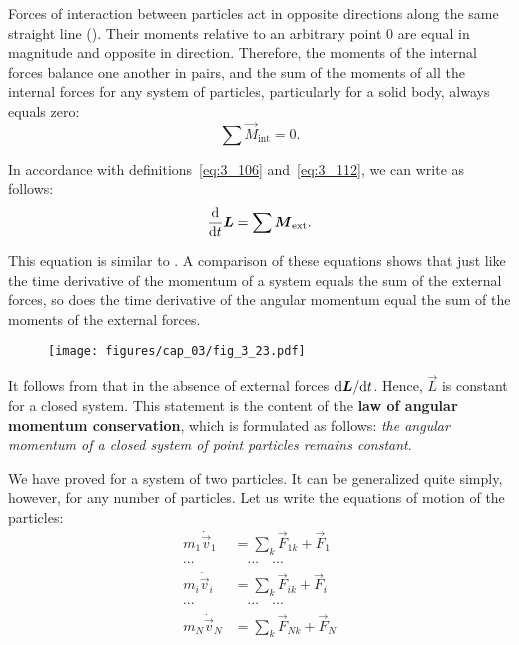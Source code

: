 Forces of interaction between particles act in opposite directions along the same straight line (). Their moments relative to an arbitrary point $0$ are equal in magnitude and opposite in direction. Therefore, the moments of the internal forces balance one another in pairs, and the sum of the moments of all the internal forces for any system of particles, particularly for a solid body, always equals zero:
\begin{equation}\label{eq:3_117}
\sum\vec{M}_{\text{int}} = 0.
\end{equation}

In accordance with definitions~\eqref{eq:3_106} and~\eqref{eq:3_112}, we can write  as follows:
\begin{equation}\label{eq:3_118}
\frac{\mathrm{d}}{\mathrm{d} t}\boldsymbol{L} = \sum\boldsymbol{M}_{\text{ext}}.
\end{equation}

\noindent
This equation is similar to . A comparison of these equations shows that just like the time derivative of the momentum of a system equals the sum of the external forces, so does the time derivative of the angular momentum equal the sum of the moments of the external forces.

\begin{figure}[t]
	\begin{center}
		\texttt{[image: figures/cap\_03/fig\_3\_23.pdf]}
		\caption[]{}
		\label{fig:3_23}
	\end{center}
	\vspace{-0.9cm}
\end{figure}

It follows from  that in the absence of external forces $\mathrm{d}\boldsymbol{L}/\mathrm{d} t$. Hence, $\vec{L}$ is constant for a closed system. This statement is the content of the \textbf{law of angular momentum conservation}, which is formulated as follows: \textit{the angular momentum of a closed system of point particles remains constant}.

We have proved  for a system of two particles. It can be generalized quite simply, however, for any number of particles. Let us write the equations of motion of the particles:
\begin{align*}
m_1\dot{\vec{v}}_1 &= \sum_k \vec{F}_{1k} + \vec{F}_1\\
\cdots & \quad\cdots \quad\cdots\\
m_i\dot{\vec{v}}_i &= \sum_k \vec{F}_{ik} + \vec{F}_i\\
\cdots & \quad\cdots \quad\cdots\\
m_N\dot{\vec{v}}_N &= \sum_k \vec{F}_{Nk} + \vec{F}_N
\end{align*}

